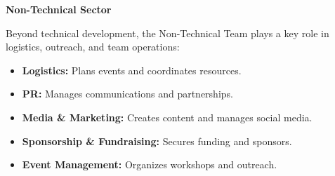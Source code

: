 \textbf{Non-Technical Sector}

Beyond technical development, the Non-Technical Team plays a key role in logistics, outreach, and team operations:
\vspace{-0.5\baselineskip}
\begin{itemize}[leftmargin=0pt, itemindent=20pt]
    \setlength{\itemsep}{0pt}
    \item \textbf{Logistics:} Plans events and coordinates resources.
    \item \textbf{PR:} Manages communications and partnerships.
    \item \textbf{Media \& Marketing:} Creates content and manages social media.
    \item \textbf{Sponsorship \& Fundraising:} Secures funding and sponsors.
    \item \textbf{Event Management:} Organizes workshops and outreach.
\end{itemize}
